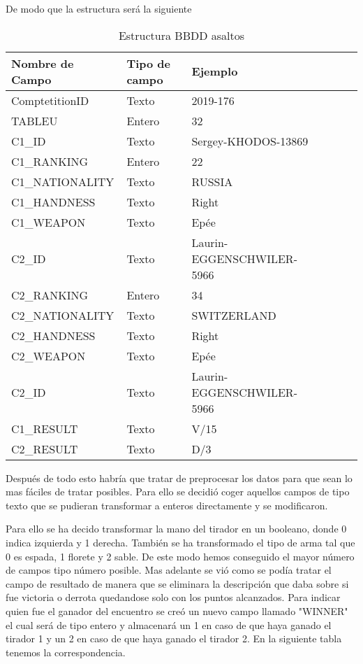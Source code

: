 De modo que la estructura será la siguiente
\begin{table}[htb]%
  \centering
  \caption{Estructura BBDD asaltos}
  \label{tab:anchura}
  \begin{tabular}{ | l | l | l | l | l | l | }
    \hline
    Nombre de Campo & Tipo de campo & Ejemplo \\ \hline
    ComptetitionID & Texto & 2019-176 \\ \hline
    TABLEU & Entero & 32 \\ \hline
    C1\_ID & Texto & Sergey-KHODOS-13869 \\ \hline
    C1\_RANKING & Entero & 22 \\ \hline
    C1\_NATIONALITY & Texto & RUSSIA \\ \hline
    C1\_HANDNESS & Texto & Right \\ \hline
    C1\_WEAPON & Texto & Epée \\ \hline
    C2\_ID & Texto & Laurin-EGGENSCHWILER-5966 \\ \hline
    C2\_RANKING & Entero & 34 \\ \hline
    C2\_NATIONALITY & Texto & SWITZERLAND \\ \hline
    C2\_HANDNESS & Texto & Right \\ \hline
    C2\_WEAPON & Texto & Epée \\ \hline
    C2\_ID & Texto & Laurin-EGGENSCHWILER-5966 \\ \hline
    C1\_RESULT & Texto & V/15 \\ \hline
    C2\_RESULT & Texto & D/3 \\
    \hline
  \end{tabular}
\end{table}

\newpage

Después de todo esto habría que tratar de preprocesar los datos para que sean
 lo mas fáciles de tratar posibles. Para ello se decidió coger aquellos campos
 de tipo texto que se pudieran transformar a enteros directamente y se modificaron.

Para ello se ha decido transformar la mano del tirador en un booleano, donde
 0 indica izquierda y 1 derecha. También se ha transformado el tipo de arma
 tal que 0 es espada, 1 florete y 2 sable. De este modo hemos conseguido el mayor
 número de campos tipo número posible. Mas adelante se vió como se podía tratar el campo de resultado de manera que se
 eliminara la descripción que daba sobre si fue victoria o derrota quedandose
 solo con los puntos alcanzados. Para indicar quien fue el ganador del encuentro
 se creó un nuevo campo llamado "WINNER" el cual será de tipo entero y almacenará un
 1 en caso de que haya ganado el tirador 1 y un 2 en caso de que haya ganado el tirador 2.
 En la siguiente tabla tenemos la correspondencia.

